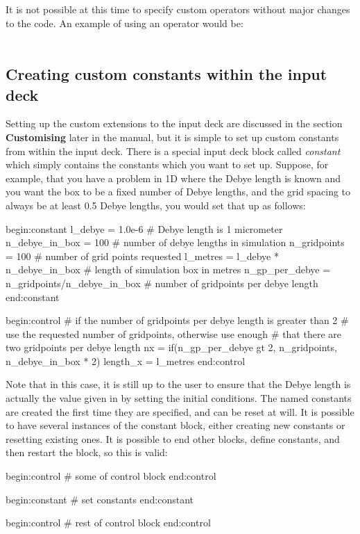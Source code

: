 It is not possible at this time to specify custom operators without major
changes to the code. An example of using an operator would be:\\
\indent{}\\

\subsection{Creating custom constants within the input deck}
Setting up the custom extensions to the input deck are discussed in the
section {\bf Customising {\EPOCH}} later in the manual, but it is simple to set
up custom constants from within the input deck. There is a special input deck
block called {\it constant} which simply contains the constants which you want
to set up. Suppose, for example, that you have a problem in 1D where the Debye
length is known and you want the box to be a fixed number of Debye lengths,
and the grid spacing to always be at least 0.5 Debye lengths, you would set
that up as follows:
\begin{boxverbatim}
begin:constant
  l_debye = 1.0e-6 # Debye length is 1 micrometer
  n_debye_in_box = 100 # number of debye lengths in simulation
  n_gridpoints = 100 # number of grid points requested
  l_metres = l_debye * n_debye_in_box # length of simulation box in metres
  n_gp_per_debye = n_gridpoints/n_debye_in_box # number of gridpoints per debye length
end:constant

begin:control
  # if the number of gridpoints per debye length is greater than 2
  # use the requested number of gridpoints, otherwise use enough
  # that there are two gridpoints per debye length
  nx = if(n_gp_per_debye gt 2, n_gridpoints, n_debye_in_box * 2)
  length_x = l_metres
end:control
\end{boxverbatim}

Note that in this case, it is still up to the user to ensure that the Debye
length is actually the value given in  by setting the
initial conditions. The named constants are created the first time they are
specified, and can be reset at will. It is possible to have several instances
of the constant block, either creating new constants or resetting existing
ones. It is possible to end other blocks, define constants, and then
restart the block, so this is valid:
\begin{boxverbatim}
begin:control
   # some of control block
end:control

begin:constant
   # set constants
end:constant

begin:control
   # rest of control block
end:control
\end{boxverbatim}

